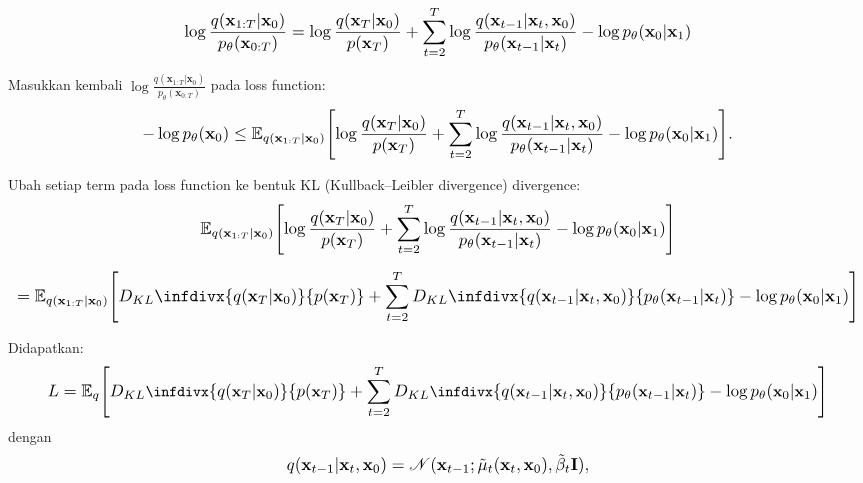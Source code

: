 \documentclass{article}
\newcommand{\infdiv}{D_{KL}\infdivx}
\newcommand*{\Scale}[2][4]{\scalebox{#1}{\ensuremath{#2}}}
\begin{document}
\begin{equation}
\Scale[1.2]{ \displaystyle \log \frac{q(\textbf{x}_{1:T}|\textbf{x}_0)}{p_\theta(\textbf{x}_{0:T})} = \log \frac{
q(\textbf{x}_T|\textbf{x}_0)
} 
{ 
p(\textbf{x}_T)
} + 
\sum_{t=2}^{T} \log \frac{
q(\textbf{x}_{t-1}|\textbf{x}_t,\textbf{x}_0)
}
{
p_\theta(\textbf{x}_{t-1}|\textbf{x}_{t})
} -
\log p_\theta(\textbf{x}_0|\textbf{x}_1)
}
\end{equation}

Masukkan kembali $ \log \frac{q(\textbf{x}_{1:T}|\textbf{x}_0)}{p_\theta(\textbf{x}_{0:T})} $ pada loss function:
\begin{equation}
\Scale[1.2]{ \displaystyle -\log p_\theta(\textbf{x}_0) \leq \mathbb{E}_{q(\textbf{x}_{1:T}|\textbf{x}_0)} \left[ 
\log \frac{
q(\textbf{x}_T|\textbf{x}_0)
} 
{ 
p(\textbf{x}_T)
} + 
\sum_{t=2}^{T} \log \frac{
q(\textbf{x}_{t-1}|\textbf{x}_t,\textbf{x}_0)
}
{
p_\theta(\textbf{x}_{t-1}|\textbf{x}_{t})
} -
\log p_\theta(\textbf{x}_0|\textbf{x}_1)
\right]. }
\end{equation}

Ubah setiap term pada loss function ke bentuk KL (Kullback–Leibler divergence) divergence:
\begin{equation}
\Scale[1.2]{ \displaystyle
\mathbb{E}_{q(\textbf{x}_{1:T}|\textbf{x}_0)} \left[ 
\log \frac{
q(\textbf{x}_T|\textbf{x}_0)
} 
{ 
p(\textbf{x}_T)
} + 
\sum_{t=2}^{T} \log \frac{
q(\textbf{x}_{t-1}|\textbf{x}_t,\textbf{x}_0)
}
{
p_\theta(\textbf{x}_{t-1}|\textbf{x}_{t})
} -
\log p_\theta(\textbf{x}_0|\textbf{x}_1)
\right] 
}
\end{equation}

\begin{equation}
\Scale[1.2]{ \displaystyle = 
\mathbb{E}_{q(\textbf{x}_{1:T}|\textbf{x}_0)} \left[ 
\infdiv{q(\textbf{x}_T|\textbf{x}_0)}{p(\textbf{x}_T)}
+ 
\sum_{t=2}^{T} \infdiv{ 
q(\textbf{x}_{t-1}|\textbf{x}_t,\textbf{x}_0)
}
{
p_\theta(\textbf{x}_{t-1}|\textbf{x}_{t})
}
-
\log p_\theta(\textbf{x}_0|\textbf{x}_1)
\right]
}
\end{equation}

Didapatkan:
\begin{equation}
\Scale[1.2]{ \displaystyle
{\small L = 
\mathbb{E}_{q} \left[ 
\infdiv{q(\textbf{x}_T|\textbf{x}_0)}{p(\textbf{x}_T)}
+ 
\sum_{t=2}^{T} \infdiv{ 
q(\textbf{x}_{t-1}|\textbf{x}_t,\textbf{x}_0)
}
{
p_\theta(\textbf{x}_{t-1}|\textbf{x}_{t})
}
-
\log p_\theta(\textbf{x}_0|\textbf{x}_1)
\right]
} }
\end{equation}
dengan 
\begin{equation}
\Scale[1.2]{ \displaystyle
q(\textbf{x}_{t-1}|\textbf{x}_t,\textbf{x}_0) = \mathscr{N}(\textbf{x}_{t-1};\tilde{\mu}_t(\textbf{x}_{t},\textbf{x}_0),\tilde{\beta}_t\textbf{I}), }
\end{equation}
\end{document}

